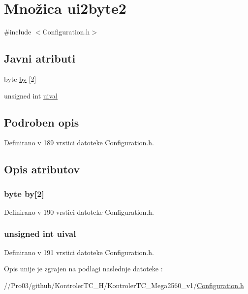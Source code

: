 \hypertarget{unionui2byte2}{}\section{ Množica ui2byte2}
\label{unionui2byte2}


{\ttfamily \#include $<$Configuration.\+h$>$}

\subsection*{Javni atributi}
\begin{DoxyCompactItemize}
\item 
byte \hyperlink{unionui2byte2_a291b49741a238245f6a13d953f87b936}{by} \mbox{[}2\mbox{]}
\item 
unsigned int \hyperlink{unionui2byte2_abbeaf8a032705918682563dd182860b5}{uival}
\end{DoxyCompactItemize}


\subsection{Podroben opis}


Definirano v 189 vrstici datoteke Configuration.\+h.



\subsection{Opis atributov}
\hypertarget{unionui2byte2_a291b49741a238245f6a13d953f87b936}{}
\subsubsection[{by}]{\setlength{\rightskip}{0pt plus 5cm}byte by\mbox{[}2\mbox{]}}\label{unionui2byte2_a291b49741a238245f6a13d953f87b936}


Definirano v 190 vrstici datoteke Configuration.\+h.

\hypertarget{unionui2byte2_abbeaf8a032705918682563dd182860b5}{}
\subsubsection[{uival}]{\setlength{\rightskip}{0pt plus 5cm}unsigned int uival}\label{unionui2byte2_abbeaf8a032705918682563dd182860b5}


Definirano v 191 vrstici datoteke Configuration.\+h.



Opis unije je zgrajen na podlagi naslednje datoteke \+:\begin{DoxyCompactItemize}
\item 
//\+Pro03/github/\+Kontroler\+T\+C\+\_\+\+H/\+Kontroler\+T\+C\+\_\+\+Mega2560\+\_\+v1/\hyperlink{_configuration_8h}{Configuration.\+h}\end{DoxyCompactItemize}
